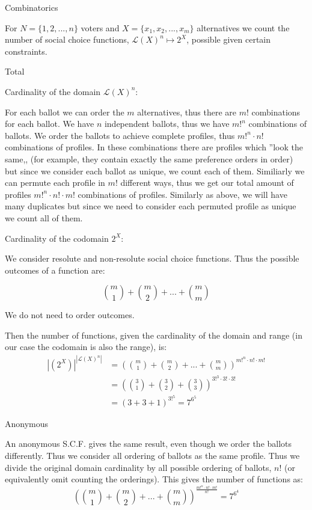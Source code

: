 \documentclass[12pt]{article}
\newenvironment{question}[2][Question]{\begin{trivlist}
\item[\hskip \labelsep {\bfseries #1}\hskip \labelsep {\bfseries #2.}]}{\end{trivlist}}
\newenvironment{answer}[2][Answer]{\begin{trivlist}
\item[\hskip \labelsep {\bfseries #1}\hskip \labelsep {\bfseries #2:}]}{\end{trivlist}}
\begin{document}
\begin{question}{3}{Combinatorics}

For $N=\{1,2, ..., n\}$ voters and $X=\{x_1, x_2, ..., x_m\}$ alternatives we count the number of social choice functions, $\mathcal{L}(X)^n \mapsto 2^X$, possible given certain constraints.
\end{question}
\begin{answer}{a)}{Total}

Cardinality of the domain $\mathcal{L}(X)^n$:

For each ballot we can order the $m$ alternatives, thus there are $m!$ combinations for each ballot.
We have $n$ independent ballots, thus we have $m!^n$ combinations of ballots.
We order the ballots to achieve complete profiles, thus $m!^n \cdot n!$ combinations of profiles. In these combinations there are profiles which ''look the same,, (for example, they contain exactly the same preference orders in order) but since we consider each ballot as unique, we count each of them.
Similiarly we can permute each profile in $m!$ different ways, thus we get our total amount of profiles $m!^n \cdot n! \cdot m!$ combinations of profiles. Similarly as above, we will have many duplicates but since we need to consider each permuted profile as unique we count all of them.

Cardinality of the codomain $2^X$:

We consider resolute and non-resolute social choice functions. Thus the possible outcomes of a function are:

$$\binom{m}{1} + \binom{m}{2} + ... + \binom{m}{m}$$

We do not need to order outcomes.

Then the number of functions, given the cardinality of the domain and range (in our case the codomain is also the range), is:
\begin{align*}
|(2^X)|^{|\mathcal{L}(X)^n|}&=(\binom{m}{1} + \binom{m}{2} + ... + \binom{m}{m})^{m!^n \cdot n! \cdot m!} \\
&=(\binom{3}{1} + \binom{3}{2} + \binom{3}{3})^{3!^3 \cdot 3! \cdot 3!} \\
&=(3 + 3 + 1)^{3!^5}= 7^{6^5}
\end{align*}


\end{answer}
\begin{answer}{b)}{Anonymous}

An anonymous S.C.F. gives the same result, even though we order the ballots differently. Thus we consider all ordering of ballots as the same profile. Thus we divide the original domain cardinality by all possible ordering of ballots, $n!$ (or equivalently omit counting the orderings). This gives the number of functions as:
$$(\binom{m}{1} + \binom{m}{2} + ... + \binom{m}{m})^{\frac{m!^n \cdot n! \cdot m!}{n!}}=7^{6^4}$$
\end{answer}
\end{document}
